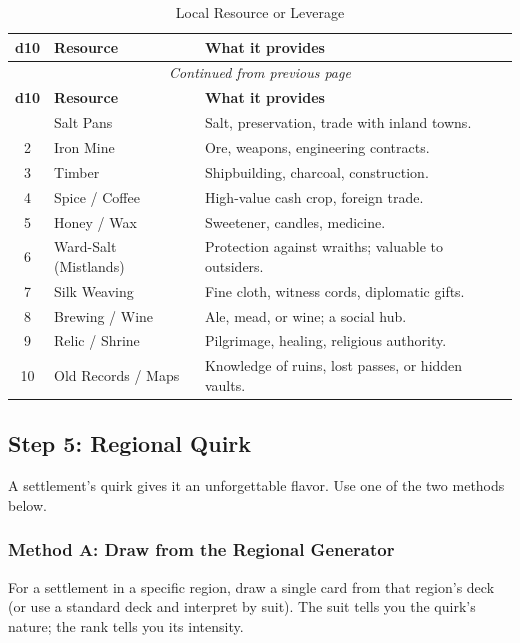 \begin{center}
\begin{longtable}{cll}
\caption{Local Resource or Leverage}\\
\toprule
\textbf{d10} & \textbf{Resource} & \textbf{What it provides} \\
\midrule
\endfirsthead
\multicolumn{3}{c}{\emph{Continued from previous page}} \\
\toprule
\textbf{d10} & \textbf{Resource} & \textbf{What it provides} \\
\midrule
\endhead
\bottomrule
\endfoot
1 & Salt Pans & Salt, preservation, trade with inland towns. \\
2 & Iron Mine & Ore, weapons, engineering contracts. \\
3 & Timber & Shipbuilding, charcoal, construction. \\
4 & Spice / Coffee & High-value cash crop, foreign trade. \\
5 & Honey / Wax & Sweetener, candles, medicine. \\
6 & Ward-Salt (Mistlands) & Protection against wraiths; valuable to outsiders. \\
7 & Silk Weaving & Fine cloth, witness cords, diplomatic gifts. \\
8 & Brewing / Wine & Ale, mead, or wine; a social hub. \\
9 & Relic / Shrine & Pilgrimage, healing, religious authority. \\
10 & Old Records / Maps & Knowledge of ruins, lost passes, or hidden vaults. \\
\end{longtable}
\end{center}

\subsection{Step 5: Regional Quirk}
\label{sec:settlement-quirk}
A settlement's quirk gives it an unforgettable flavor. Use one of the two methods below.

\subsubsection{Method A: Draw from the Regional Generator}
For a settlement in a specific region, draw a single card from that region's deck (or use a standard deck and interpret by suit). The suit tells you the quirk's nature; the rank tells you its intensity.

